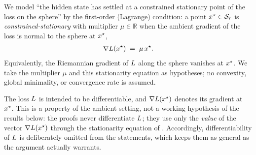 \begin{definition}
\label{def:stationarity}
We model ``the hidden state has settled at a constrained stationary point of the loss on the
sphere'' by the first-order (Lagrange) condition: a point $x^{\star} \in \mathcal{S}_r$ is
\emph{constrained-stationary} with multiplier $\mu \in \mathbb{R}$ when the ambient gradient
of the loss is normal to the sphere at $x^{\star}$,
\begin{align*}
\nabla L(x^{\star}) \;=\; \mu\,x^{\star}.
\end{align*}
Equivalently, the Riemannian gradient of $L$ along the sphere vanishes at $x^{\star}$. We
take the multiplier $\mu$ and this stationarity equation as hypotheses; no convexity, global
minimality, or convergence rate is assumed.
\end{definition}

\begin{remark}
\label{rem:differentiability}
The loss $L$ is intended to be differentiable, and $\nabla L(x^{\star})$ denotes its
gradient at $x^{\star}$. This is a property of the ambient setting, not a working hypothesis of
the results below: the proofs never differentiate $L$; they use only the \emph{value} of
the vector $\nabla L(x^{\star})$ through the stationarity equation of
. Accordingly, differentiability of $L$ is deliberately omitted
from the statements, which keeps them as general as the argument actually warrants.
\end{remark}
